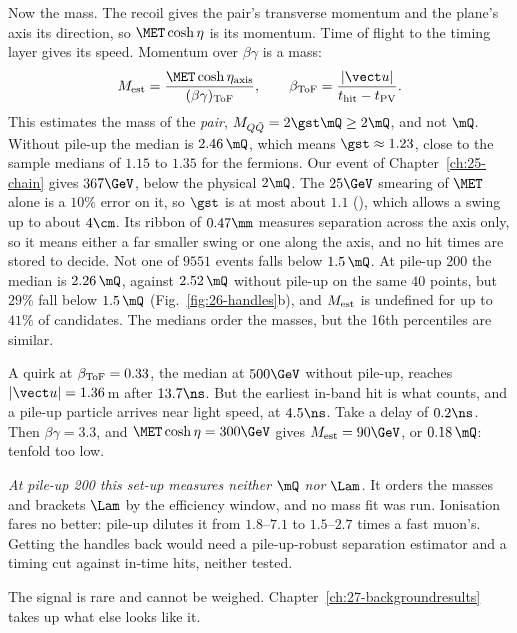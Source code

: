 Now the mass. The recoil gives the pair's transverse momentum and the plane's axis its direction, so $\MET\cosh\eta$ is its momentum. Time of flight to the timing layer gives its speed. Momentum over
$\beta\gamma$ is a mass:
\begin{equation}
  M_{\rm est}=\frac{\MET\cosh\eta_{\rm axis}}{(\beta\gamma)_{\rm ToF}},\qquad \beta_{\rm ToF}=\frac{|\vect u|}{t_{\rm hit}-t_{\rm PV}} .
  \label{eq:26-Mest}
\end{equation}
This estimates the mass of the \emph{pair}, $M_{Q\bar Q}=2\gst\mQ\ge2\mQ$, and not $\mQ$. Without pile-up the median is $2.46\,\mQ$, which means $\gst\approx1.23$, close to the sample medians of $1.15$ to
$1.35$ for the fermions. Our event of Chapter~\ref{ch:25-chain} gives $367\GeV$, below the physical $2\mQ$. The $25\GeV$ smearing of $\MET$ alone is a $10\%$ error on it, so $\gst$ is at most about $1.1$ (\EST), which allows a swing up to about $4\cm$. Its ribbon of $0.47\mm$ measures separation across the axis only, so it means either a far smaller swing or one along the axis, and no hit times are stored to decide. Not one of $9551$ events falls below $1.5\,\mQ$. At pile-up 200 the median is $2.26\,\mQ$, against $2.52\,\mQ$ without pile-up on the same $40$ points, but $29\%$ fall below $1.5\,\mQ$ (Fig.~\ref{fig:26-handles}b),
and $M_{\rm est}$ is undefined for up to $41\%$ of candidates. The medians order the masses, but the 16th percentiles are similar.

\begin{example}\label{exa:26-prompt}
A quirk at $\beta_{\rm ToF}=0.33$, the median at $500\GeV$ without pile-up, reaches $|\vect u|=1.36$\,m after $13.7\ns$. But the earliest in-band hit is what counts, and a pile-up particle arrives near light speed,
at $4.5\ns$. Take a delay of $0.2\ns$. Then $\beta\gamma=3.3$, and $\MET\cosh\eta=300\GeV$ gives $M_{\rm est}=90\GeV$, or $0.18\,\mQ$: tenfold too low.
\end{example}

\emph{At pile-up 200 this set-up measures neither $\mQ$ nor $\Lam$.} It orders the masses
and brackets $\Lam$ by the efficiency window, and no mass fit was run. Ionisation fares no better: pile-up dilutes it from $1.8$--$7.1$ to $1.5$--$2.7$ times a fast muon's. Getting the handles back would need a pile-up-robust separation estimator and a timing cut against in-time hits, neither tested.

The signal is rare and cannot be weighed. Chapter~\ref{ch:27-backgroundresults} takes up what else looks like it.

